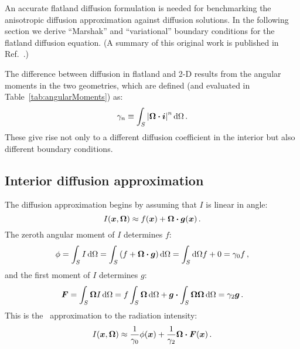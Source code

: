 An accurate flatland diffusion formulation
is needed for benchmarking the anisotropic diffusion
approximation against diffusion solutions.
In the following section we derive ``Marshak'' and ``variational'' boundary
conditions for the flatland diffusion equation. (A summary of this original
work is published in Ref.~\cite{Joh2011a}.)

The difference between diffusion in flatland and 2-D results from the
angular moments in the two geometries, which
are defined (and evaluated in Table~\ref{tab:angularMoments}) as:
\begin{equation*}
  \gamma_n \equiv \int_S \left| \bm{\Omega} \bm{\cdot} \bm{i} \right|^n \mathop{}\!\mathrm{d}\Omega\,.
\end{equation*}
These give rise not only to a different diffusion coefficient in the interior
but also different boundary conditions.

\subsection{Interior diffusion approximation}

The diffusion approximation begins by assuming that $I$ is linear in angle:
\begin{equation*}
  I(\bm{x}, \bm{\Omega}) \approx f(\bm{x}) + \bm{\Omega} \bm{\cdot}
  \bm{g}(\bm{x})\,.
\end{equation*}
The zeroth angular moment of $I$ determines $f$:
\begin{equation*}
  \phi = \int_S I \mathop{}\!\mathrm{d}\Omega
= \int_S \left( f + \bm{\Omega}\bm{\cdot} \bm{g} \right) \mathop{}\!\mathrm{d}\Omega
= \int_S\mathop{}\!\mathrm{d}\Omega f + 0
= \gamma_0 f \,,
\end{equation*}
and the first moment of $I$ determines $g$:
\begin{equation*}
  \bm{F} = \int_S \bm{\Omega} I \mathop{}\!\mathrm{d}\Omega
= f \int_S \bm{\Omega} \mathop{}\!\mathrm{d}\Omega
  + \bm{g} \bm{\cdot} \int_S \bm{\Omega}\bm{\Omega} \mathop{}\!\mathrm{d}\Omega
= \gamma_2 \bm{g} \,.
\end{equation*}
This is the \Pone\ approximation to the radiation intensity:
\begin{equation}\label{eq:ssPone}
  I(\bm{x}, \bm{\Omega})
  \approx \frac{1}{\gamma_0} \phi(\bm{x})
  + \frac{1}{\gamma_2} \bm{\Omega} \bm{\cdot} \bm{F}(\bm{x})\,.
\end{equation}


